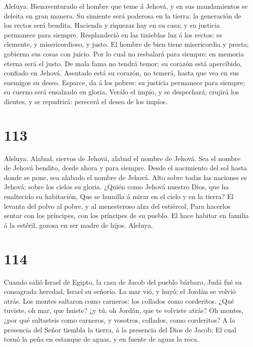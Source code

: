  Aleluya. Bienaventurado el hombre que teme á Jehová, y en
sus mandamientos se deleita en gran manera.  Su simiente
será poderosa en la tierra: la generación de los rectos será bendita.
 Hacienda y riquezas hay en su casa; y su justicia
permanece para siempre.  Resplandeció en las tinieblas luz
á los rectos: es clemente, y misericordioso, y justo.  El
hombre de bien tiene misericordia y presta; gobierna sus cosas con
juicio.  Por lo cual no resbalará para siempre: en memoria
eterna será el justo.  De mala fama no tendrá temor: su
corazón está apercibido, confiado en Jehová.  Asentado
está su corazón, no temerá, hasta que vea en sus enemigos su deseo.
 Esparce, da á los pobres: su justicia permanece para
siempre; su cuerno será ensalzado en gloria.  Verálo el
impío, y se despechará; crujirá los dientes, y se repudrirá: perecerá el
deseo de los impíos.

\hypertarget{section-112}{%
\section{113}\label{section-112}}

 Aleluya. Alabad, siervos de Jehová, alabad el nombre de
Jehová.  Sea el nombre de Jehová bendito, desde ahora y
para siempre.  Desde el nacimiento del sol hasta donde se
pone, sea alabado el nombre de Jehová.  Alto sobre todas
las naciones es Jehová; sobre los cielos su gloria. 
¿Quién como Jehová nuestro Dios, que ha enaltecido su habitación,
 Que se humilla á mirar en el cielo y en la tierra?
 El levanta del polvo al pobre, y al menesteroso alza del
estiércol,  Para hacerlos sentar con los príncipes, con
los príncipes de su pueblo.  El hace habitar en familia á
la estéril, gozosa en ser madre de hijos. Aleluya.

\hypertarget{section-113}{%
\section{114}\label{section-113}}

 Cuando salió Israel de Egipto, la casa de Jacob del
pueblo bárbaro,  Judá fué su consagrada heredad, Israel su
señorío.  La mar vió, y huyó; el Jordán se volvió atrás.
 Los montes saltaron como carneros: los collados como
corderitos.  ¿Qué tuviste, oh mar, que huiste? ¿y tú, oh
Jordán, que te volviste atrás?  Oh montes, ¿por qué
saltasteis como carneros, y vosotros, collados, como corderitos?
 A la presencia del Señor tiembla la tierra, á la
presencia del Dios de Jacob;  El cual tornó la peña en
estanque de aguas, y en fuente de aguas la roca.

